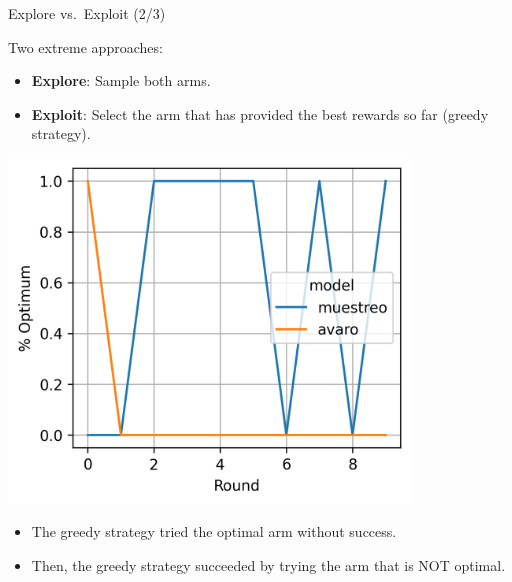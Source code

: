 \documentclass[11pt]{beamer}
\begin{document}
\begin{frame}{Explore vs.~Exploit (2/3)}

Two extreme approaches:

\begin{itemize}
\item \textbf{Explore}: Sample both arms.
\item \textbf{Exploit}: Select the arm that has provided the best rewards so far (greedy strategy).
\end{itemize}

\begin{minipage}{.6\linewidth}
\begin{center}
\includegraphics[width=0.8\textwidth]{images/abajo}
\end{center}
\end{minipage}\begin{minipage}{.4\linewidth}
\begin{itemize}
\item The greedy strategy tried the optimal arm without success.
\item Then, the greedy strategy succeeded by trying the arm that is NOT optimal.
\end{itemize}
\end{minipage}

\end{frame}
\end{document}
